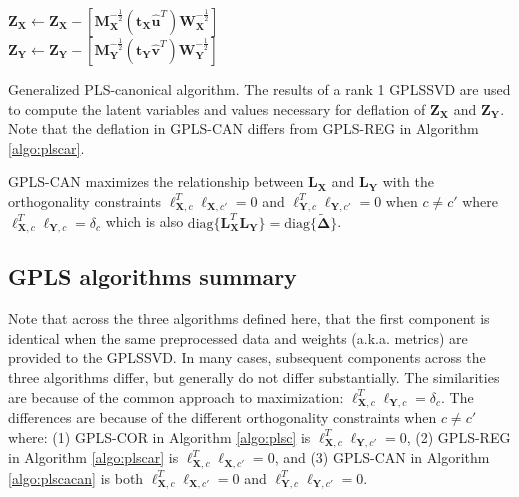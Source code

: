 \documentclass[12pt]{article}
\begin{document}
\begin{algorithm}
{  ${\mathbf Z}_{{\mathbf X}} \leftarrow {\mathbf Z}_{{\mathbf X}} - [{\mathbf M}_{\mathbf X}^{-\frac{1}{2}}({\mathbf t}_{\mathbf X}\widehat{\mathbf u}^{T}){\mathbf W}_{\mathbf X}^{-\frac{1}{2}}]$\\
   ${\mathbf Z}_{{\mathbf Y}} \leftarrow {\mathbf Z}_{{\mathbf Y}} - [{\mathbf M}_{\mathbf Y}^{-\frac{1}{2}}({\mathbf t}_{\mathbf Y}\widehat{\mathbf v}^{T}){\mathbf W}_{\mathbf Y}^{-\frac{1}{2}}]$
}
\caption{Generalized PLS-canonical algorithm. The results of a rank 1 GPLSSVD are used to compute the latent variables and values necessary for deflation of ${\mathbf Z}_{{\mathbf X}}$ and ${\mathbf Z}_{{\mathbf Y}}$. Note that the deflation in GPLS-CAN differs from GPLS-REG in Algorithm \ref{algo:plscar}.}
\label{algo:plscacan}
\end{algorithm}

GPLS-CAN maximizes the relationship between \({\mathbf L}_{\mathbf X}\)
and \({\mathbf L}_{\mathbf Y}\) with the orthogonality constraints
\({\boldsymbol \ell}_{{\mathbf X},c}^{T}{\boldsymbol \ell}_{{\mathbf X},c'} = 0\)
and
\({\boldsymbol \ell}_{{\mathbf Y},c}^{T}{\boldsymbol \ell}_{{\mathbf Y},c'} = 0\)
when \(c \neq c'\) where
\({\boldsymbol \ell}_{{\mathbf X},c}^{T}{\boldsymbol \ell}_{{\mathbf Y},c} = \delta_{c}\)
which is also
\(\mathrm{diag\{}{\mathbf L}_{\mathbf X}^{T}{\mathbf L}_{\mathbf Y}\mathrm{\}} = \mathrm{diag\{}\widetilde{\boldsymbol \Delta}\mathrm{\}}\).

\hypertarget{gpls-algorithms-summary}{%
\subsection{GPLS algorithms summary}\label{gpls-algorithms-summary}}

Note that across the three algorithms defined here, that the first
component is identical when the same preprocessed data and weights
(a.k.a. metrics) are provided to the GPLSSVD. In many cases, subsequent
components across the three algorithms differ, but generally do not
differ substantially. The similarities are because of the common
approach to maximization:
\({\boldsymbol \ell}_{{\mathbf X},c}^{T}{\boldsymbol \ell}_{{\mathbf Y},c} = \delta_{c}\).
The differences are because of the different orthogonality constraints
when \(c \neq c'\) where: (1) GPLS-COR in Algorithm \ref{algo:plsc} is
\({\boldsymbol \ell}_{{\mathbf X},c}^{T}{\boldsymbol \ell}_{{\mathbf Y},c'} = 0\),
(2) GPLS-REG in Algorithm \ref{algo:plscar} is
\({\boldsymbol \ell}_{{\mathbf X},c}^{T}{\boldsymbol \ell}_{{\mathbf X},c'} = 0\),
and (3) GPLS-CAN in Algorithm \ref{algo:plscacan} is both
\({\boldsymbol \ell}_{{\mathbf X},c}^{T}{\boldsymbol \ell}_{{\mathbf X},c'} = 0\)
and
\({\boldsymbol \ell}_{{\mathbf Y},c}^{T}{\boldsymbol \ell}_{{\mathbf Y},c'} = 0\).
\end{document}
